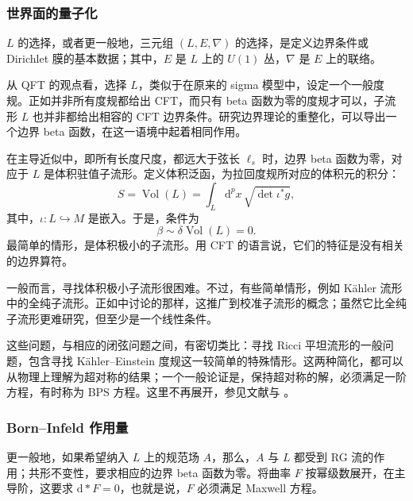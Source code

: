 \subsubsection{世界面的量子化}\label{sec:3.5.2.3}

$L$ 的选择，或者更一般地，三元组 $(L,E,\nabla)$ 的选择，是定义边界条件或 Dirichlet 膜的基本数据；其中，$E$ 是 $L$ 上的 $U(1)$ 丛，$\nabla$ 是 $E$ 上的联络。

从 QFT 的观点看，选择 $L$，类似于在原来的 sigma 模型中，设定一个一般度规。正如并非所有度规都给出 CFT，而只有 beta 函数为零的度规才可以，子流形 $L$ 也并非都给出相容的 CFT 边界条件。研究边界理论的重整化，可以导出一个边界 beta 函数，在这一语境中起着相同作用。

在主导近似中，即所有长度尺度，都远大于弦长 $\ell_s$ 时，边界 beta 函数为零，对应于 $L$ 是体积驻值子流形。定义体积泛函，为拉回度规所对应的体积元的积分：
\begin{equation}\label{eq:3.141}
S=\operatorname{Vol}(L)
=\int_L\mathrm{d}^px\,\sqrt{\det\iota^*g},
\end{equation}
其中，$\iota\colon L\hookrightarrow M$ 是嵌入。于是，条件为
\[
\beta\sim\delta\operatorname{Vol}(L)=0.
\]
最简单的情形，是体积极小的子流形。用 CFT 的语言说，它们的特征是没有相关的边界算符。

一般而言，寻找体积极小子流形很困难。不过，有些简单情形，例如 K\"ahler 流形中的全纯子流形。正如中讨论的那样，这推广到校准子流形的概念；虽然它比全纯子流形更难研究，但至少是一个线性条件。

这些问题，与相应的闭弦问题之间，有密切类比：寻找 Ricci 平坦流形的一般问题，包含寻找 K\"ahler--Einstein 度规这一较简单的特殊情形。这两种简化，都可以从物理上理解为超对称的结果；一个一般论证是，保持超对称的解，必须满足一阶方程，有时称为 BPS 方程。这里不再展开，参见文献与 。

\subsubsection{Born--Infeld 作用量}\label{sec:3.5.2.4}

更一般地，如果希望纳入 $L$ 上的规范场 $A$，那么，$A$ 与 $L$ 都受到 RG 流的作用；共形不变性，要求相应的边界 beta 函数为零。将曲率 $F$ 按幂级数展开，在主导阶，这要求 $\mathrm{d}*F=0$，也就是说，$F$ 必须满足 Maxwell 方程。

